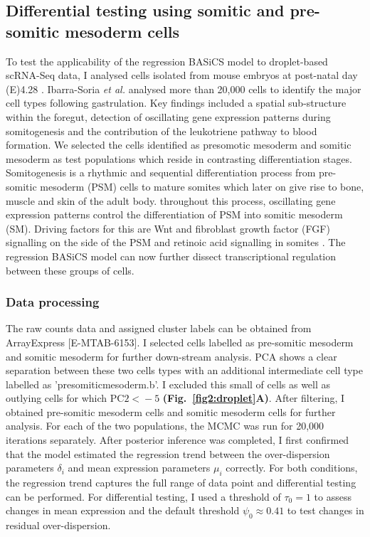 \newpage

\subsection{Differential testing using somitic and pre-somitic mesoderm cells}

To test the applicability of the regression BASiCS model to droplet-based scRNA-Seq data, I analysed cells isolated from mouse embryos at post-natal day (E)4.28 \citep{Ibarra-Soria2018}. Ibarra-Soria \emph{et al.} analysed more than 20,000 cells to identify the major cell types following gastrulation. Key findings included a spatial sub-structure within the foregut, detection of oscillating gene expression patterns during somitogenesis and the contribution of the leukotriene pathway to blood formation.  We selected the cells identified as presomotic mesoderm and somitic mesoderm as test populations which reside in contrasting differentiation stages. Somitogenesis is a rhythmic and sequential differentiation process from pre-somitic mesoderm (PSM) cells to mature somites which later on give rise to bone, muscle and skin of the adult body. throughout this process, oscillating gene expression patterns control the differentiation of PSM into somitic mesoderm (SM). Driving factors for this are Wnt and fibroblast growth factor (FGF) signalling on the side of the PSM and retinoic acid signalling in somites \cite{Oates2012}. The regression BASiCS model can now further dissect transcriptional regulation between these groups of cells.

\subsubsection{Data processing}

The raw counts data and assigned cluster labels can be obtained from ArrayExpress [E-MTAB-6153]. I selected cells labelled as pre-somitic mesoderm and somitic mesoderm for further down-stream analysis. PCA shows a clear separation between these two cells types with an additional intermediate cell type labelled as 'presomiticmesoderm.b'. I excluded this small of cells as well as outlying cells for which $\text{PC2}{}<{}-5$ \textbf{(Fig.~\ref{fig2:droplet}A)}. After filtering, I obtained  pre-somitic mesoderm cells and  somitic mesoderm cells for further analysis. For each of the two populations, the MCMC was run for 20,000 iterations separately. After posterior inference was completed, I first confirmed that the model estimated the regression trend between the over-dispersion parameters $\delta_i$ and mean expression parameters $\mu_i$ correctly. For both conditions, the regression trend captures the full range of data point and differential testing can be performed. For differential testing, I used a threshold of $\tau_0=1$ to assess changes in mean expression and the default threshold $\psi_0\approx{}0.41$ to test changes in residual over-dispersion.  

